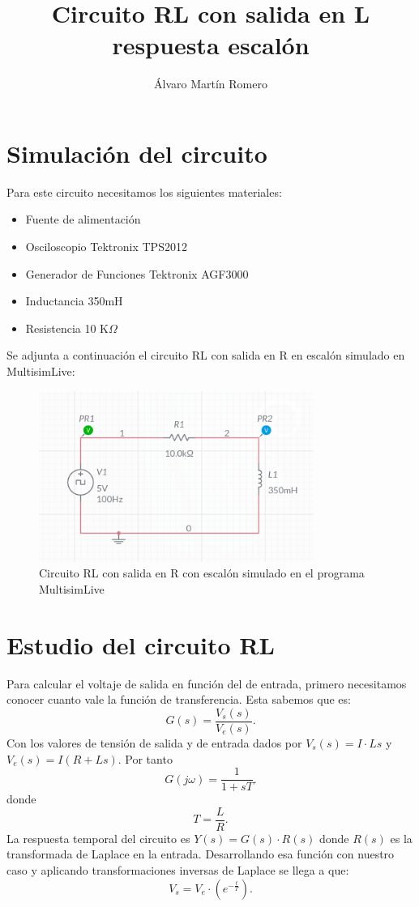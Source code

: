 \documentclass[11pt,letterpaper]{article}
\title{Circuito RL con salida en L respuesta escalón}
\author{Álvaro Martín Romero}
\begin{document}
\maketitle	
\section{Simulación del circuito}%
\label{sec:Simulación del circuito}
Para este circuito necesitamos los siguientes materiales:
\begin{itemize}
	\item Fuente de alimentación
	\item Osciloscopio Tektronix TPS2012
	\item Generador de Funciones Tektronix AGF3000
	\item Inductancia 350mH
	\item Resistencia 10 K$\Omega$
\end{itemize}
Se adjunta a continuación el circuito RL con salida en R en escalón simulado en MultisimLive:
\begin{figure}[H]
	\centering
	\includegraphics[width=0.8\textwidth]{imagen/circuitoRL_Rescalon.png}
	\caption{Circuito RL con salida en R con escalón simulado en el programa MultisimLive}
	\label{fig:imagen-circuitoRL}
\end{figure}
\section{Estudio del circuito RL}%
\label{sec:Estudio del circuito RL}
Para calcular el voltaje de salida en función del de entrada, primero necesitamos conocer cuanto vale la función de transferencia. Esta sabemos que es:
\[
	G\left( s \right) =\frac{V_s(s)}{V_e(s)}
.\] 
Con los valores de tensión de salida y de entrada dados por $V_s\left( s \right) =I\cdot Ls$ y $V_e\left( s \right) =I\left( R+Ls \right) $. Por tanto
\[
	G\left( j\omega \right) =\frac{1}{1+sT}
.\] 
donde \[
T=\frac{L}{R}
.\] 
La respuesta temporal del circuito es $Y(s)=G(s)\cdot R(s)$ donde $R(s)$ es la transformada de Laplace en la entrada. Desarrollando esa función con nuestro caso y aplicando transformaciones inversas de Laplace se llega a que:
\[
	V_{s}=V_e\cdot \left(e^{-\frac{t}{T}} \right) 
.\] 
\end{document}
